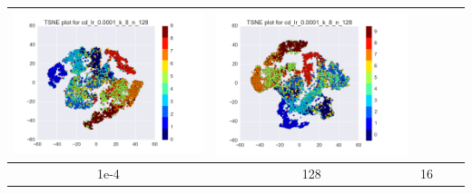 \documentclass[12pt]{report}
\begin{document}
\begin{table}[H]
\begin{tabular}{ | c | c | c | c || c |}
\begin{minipage}{.3\textwidth}
      \includegraphics[scale=0.25]{cd_lr_0_0001_k_8_n_128.png}
    \end{minipage} &
    \begin{minipage}{.3\textwidth}
      \includegraphics[scale=0.25]{test_cd_lr_0_0001_k_8_n_128.png}
    \end{minipage}
        \\ \hline
    1e-4 & 128 & 16 &
    \begin{minipage}{.3\textwidth}

\end{minipage}
\end{tabular}
\end{table}
\end{document}
